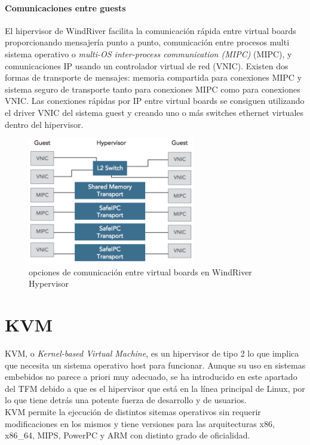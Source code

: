 \paragraph{Comunicaciones entre guests}
El hipervisor de WindRiver facilita la comunicación rápida entre virtual boards proporcionando mensajería punto a punto, comunicación entre procesos multi sistema operativo o \textit{multi-OS inter-process communication (MIPC)} (\acrshort{MIPC}), y comunicaciones IP usando un controlador virtual de red (VNIC). Existen dos formas de transporte de mensajes: memoria compartida para conexiones \acrshort{MIPC} y sistema seguro de transporte tanto para conexiones \acrshort{MIPC} como para conexiones \acrshort{VNIC}. Las conexiones rápidas por IP entre virtual boards se consiguen utilizando el driver \acrshort{VNIC} del sistema guest y creando uno o más switches ethernet virtuales dentro del hipervisor.
\begin{figure}[!htb]
  \centering
  \includegraphics[width=0.65\textwidth]{recursos/windriver_com.png}
  \caption{opciones de comunicación entre virtual boards en WindRiver Hypervisor}
  \label{fig:windriver_com}
\end{figure}

\section{KVM}
KVM, o \textit{Kernel-based Virtual Machine}, es un hipervisor de tipo 2 lo que implica que necesita un sistema operativo host para funcionar. Aunque su uso en sistemas embebidos no parece a priori muy adecuado,
se ha introducido en este apartado del TFM debido a que es el hipervisor que está en la línea principal de Linux, por lo que tiene detrás una potente fuerza de desarrollo y de usuarios.\\
KVM permite la ejecución de distintos sitemas operativos \cite{kvm_list} sin requerir modificaciones en los mismos y tiene versiones para las arquitecturas x86, x86\_64, MIPS, PowerPC y ARM con distinto grado de oficialidad.


